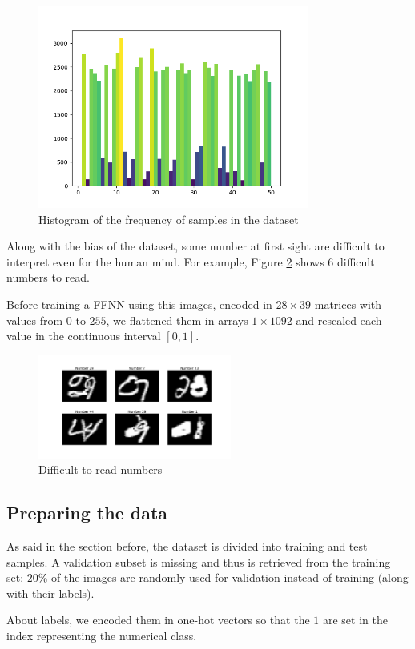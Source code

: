 \documentclass[compsoc]{IEEEtran}
\begin{document}
\begin{figure}[ht!]
\centering                                                                        
\includegraphics[width=3.5in]{datahist.png}
\captionsetup{justification=centering}                                                                                                                                   
\caption{Histogram of the frequency of samples in the dataset}
\label{fig:datahist}
\end{figure}


Along with the bias of the dataset, some number at first sight are difficult to interpret even for the human mind. For example,
Figure \ref{fig:unread} shows 6 difficult numbers to read. \par

Before training a FFNN using this images, encoded in $28\times39$ matrices with values from $0$ to $255$, we flattened them in
arrays $1\times1092$ and rescaled each value in the continuous interval $[0, 1]$.

\begin{figure}[ht!]
\centering                                                                        
\includegraphics[width=2.5in]{unread.png}
\captionsetup{justification=centering}                                                                                                                                   
\caption{Difficult to read numbers}
\label{fig:unread}
\end{figure}


\subsection{Preparing the data}
As said in the section before, the dataset is divided into training and test samples. A validation subset is missing and thus
is retrieved from the training set: $20\%$ of the images are randomly used for validation instead of training (along with their labels). \par
About labels, we encoded them in one-hot vectors so that the $1$ are set in the index representing the numerical class.
\end{document}
